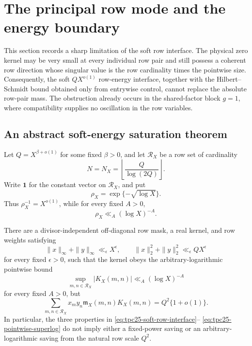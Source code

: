 \section{The principal row mode and the energy boundary}
\label{sec:tpc25-energy-boundary}

This section records a sharp limitation of the soft row interface.  The
physical zero kernel may be very small at every individual row pair and
still possess a coherent row direction whose singular value is the row
cardinality times the pointwise size.  Consequently, the soft
\(QX^{o(1)}\) row-energy interface, together with the
Hilbert--Schmidt bound obtained only from entrywise control, cannot
replace the absolute row-pair mass.  The obstruction already occurs in the
shared-factor block \(g=1\), where compatibility supplies no oscillation
in the row variables.

\subsection{An abstract soft-energy saturation theorem}

Let \(Q=X^{\beta+o(1)}\) for some fixed \(\beta>0\), and let
\(\mathcal R_X\) be a row set of cardinality
\begin{equation}
 N=N_X=\left\lfloor\frac{Q}{\log(2Q)}\right\rfloor.
 \label{eq:tpc25-row-cardinality}
\end{equation}
Write \(\mathbf 1\) for the constant vector on \(\mathcal R_X\), and
put
\begin{equation}
 \rho_X=\exp\{-\sqrt{\log X}\}.
 \label{eq:tpc25-rho}
\end{equation}
Thus \(\rho_X^{-1}=X^{o(1)}\), while for every fixed \(A>0\),
\begin{equation}
 \rho_X\ll_A(\log X)^{-A}.
 \label{eq:tpc25-rho-log}
\end{equation}

\begin{theorem}
\label{thm:tpc25-soft-energy-no-go}
There are a divisor-independent off-diagonal row mask, a real kernel,
and row weights satisfying
\begin{equation}
 \|x\|_\infty+\|y\|_\infty\ll_\epsilon X^\epsilon,
 \qquad
 \|x\|_2^2+\|y\|_2^2\ll_\epsilon QX^\epsilon
 \label{eq:tpc25-soft-row-interface}
\end{equation}
for every fixed \(\epsilon>0\), such that the kernel obeys the
arbitrary-logarithmic pointwise bound
\begin{equation}
 \sup_{m,n\in\mathcal R_X}|K_X(m,n)|
 \ll_A(\log X)^{-A}
 \label{eq:tpc25-pointwise-superlog}
\end{equation}
for every fixed \(A>0\), but
\begin{equation}
 \sum_{m,n\in\mathcal R_X}
 x_my_n\mathfrak m_X(m,n)K_X(m,n)
 =Q^2\{1+o(1)\}.
 \label{eq:tpc25-natural-scale-saturation}
\end{equation}
In particular, the three properties in
\eqref{eq:tpc25-soft-row-interface}--
\eqref{eq:tpc25-pointwise-superlog} do not imply either a fixed-power
saving or an arbitrary-logarithmic saving from the natural row scale
\(Q^2\).
\end{theorem}

